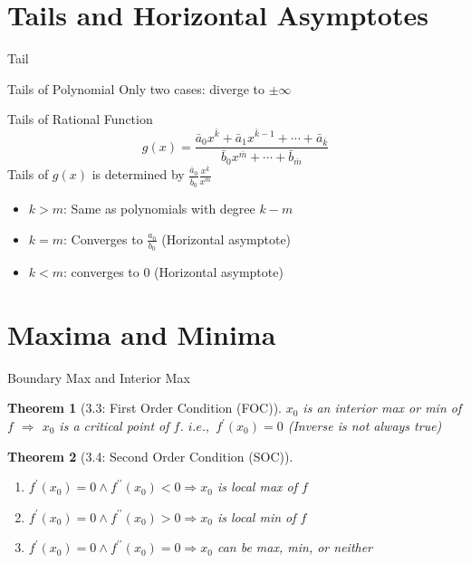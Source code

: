 \documentclass[a4paper,11pt]{article}
\newtheorem{thm}{Theorem}
\begin{document}
\section{Tails and Horizontal Asymptotes} %
\label{sec:tails_and_horizontal_asymptotes}
\begin{frame}[t]{Tail}
	\begin{block}
		{Tails of Polynomial}
		Only two cases: diverge to $\pm\infty$
	\end{block}
	\begin{block}
		{Tails of Rational Function}
		\[
			g(x) = \frac{\bar a_0 x^{\bar k} + \bar a_1 x^{\bar k-1} + \cdots + \bar a_{\bar k}}{\bar b_0 x^{\bar m} + \cdots +\bar b_{\bar m}}
		\]
		Tails of $g(x)$ is determined by $\frac{\bar a_0}{\bar b_0}\frac{x^{\bar k}}{x^{\bar m}}$
		\begin{itemize}
			\item $k>m$: Same as polynomials with degree $k-m$
			\item $k=m$: Converges to $\frac{a_0}{b_0}$ (Horizontal asymptote)
			\item $k<m$: converges to $0$ (Horizontal asymptote)
		\end{itemize}
	\end{block}
\end{frame}

\section{Maxima and Minima} %
\label{sec:maxima_and_minima}
\begin{frame}[t]{Boundary Max and Interior Max}
	\begin{thm}
		[3.3: First Order Condition (FOC)]
		$x_0$ is an interior max or min of $f$ $\Rightarrow$ $x_0$ is a critical point of $f$. $i.e.,$ $f^\prime(x_0)=0$
		(Inverse is not always true)
	\end{thm}
	
	\begin{thm}
		[3.4: Second Order Condition (SOC)]
		\begin{enumerate}
			\item $f^\prime(x_0)=0 \land f^{\prime\prime}(x_0)<0 \Rightarrow x_0$ is local max of $f$
			\item $f^\prime(x_0)=0 \land f^{\prime\prime}(x_0)>0 \Rightarrow x_0$ is local min of $f$
			\item $f^\prime(x_0)=0 \land f^{\prime\prime}(x_0)=0 \Rightarrow x_0$ can be max, min, or neither
		\end{enumerate}
	\end{thm}
\end{frame}
\end{document}
